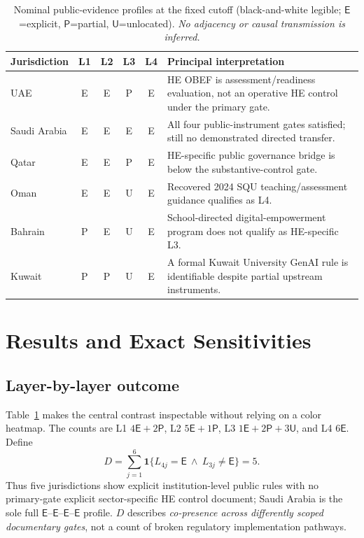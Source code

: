 \documentclass[conference,letterpaper]{IEEEtran}
\newcommand{\stE}{\textsf{E}}
\newcommand{\stP}{\textsf{P}}
\newcommand{\stU}{\textsf{U}}
\begin{document}
\begin{table}[t]
\centering\caption{Nominal public-evidence profiles at the fixed cutoff (black-and-white legible; $\stE$=explicit, $\stP$=partial, $\stU$=unlocated). \emph{No adjacency or causal transmission is inferred.}}\label{tab:profiles}
\footnotesize
\begin{tabularx}{\textwidth}{@{}p{}ccccX@{}}
\toprule
Jurisdiction & L1 & L2 & L3 & L4 & Principal interpretation\tabularnewline\midrule
UAE & \stE & \stE & \stP & \stE & HE OBEF is assessment/readiness evaluation, not an operative HE control under the primary gate.\tabularnewline
Saudi Arabia & \stE & \stE & \stE & \stE & All four public-instrument gates satisfied; still no demonstrated directed transfer.\tabularnewline
Qatar & \stE & \stE & \stP & \stE & HE-specific public governance bridge is below the substantive-control gate.\tabularnewline
Oman & \stE & \stE & \stU & \stE & Recovered 2024 SQU teaching/assessment guidance qualifies as L4.\tabularnewline
Bahrain & \stP & \stE & \stU & \stE & School-directed digital-empowerment program does not qualify as HE-specific L3.\tabularnewline
Kuwait & \stP & \stP & \stU & \stE & A formal Kuwait University GenAI rule is identifiable despite partial upstream instruments.\tabularnewline
\bottomrule
\end{tabularx}
\end{table}

\section{Results and Exact Sensitivities}
\subsection{Layer-by-layer outcome}
Table~\ref{tab:profiles} makes the central contrast inspectable without relying on a color heatmap. The counts are L1 $4\stE+2\stP$, L2 $5\stE+1\stP$, L3 $1\stE+2\stP+3\stU$, and L4 $6\stE$. Define
\begin{equation}\label{eq:discontinuity}
D=\sum_{j=1}^{6}\mathbf{1}\{L_{4j}=\stE\ \wedge\ L_{3j}\neq\stE\}=5.
\end{equation}
Thus five jurisdictions show explicit institution-level public rules with no primary-gate explicit sector-specific HE control document; Saudi Arabia is the sole full $\stE$--$\stE$--$\stE$--$\stE$ profile. $D$ describes \emph{co-presence across differently scoped documentary gates}, not a count of broken regulatory implementation pathways.
\end{document}
